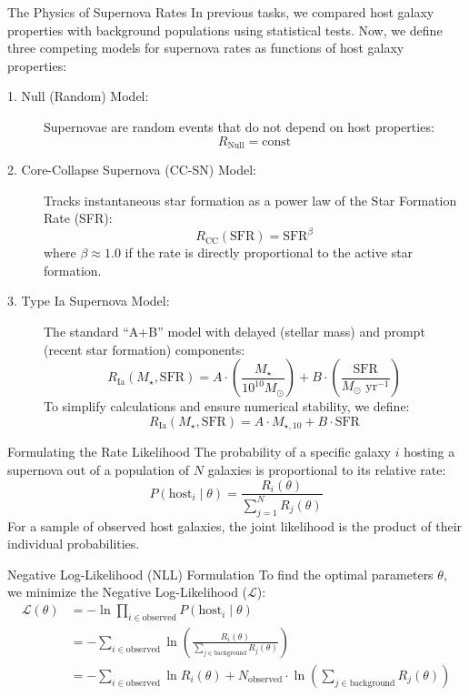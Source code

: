 \documentclass[9pt]{beamer}
\begin{document}
\begin{frame}{The Physics of Supernova Rates}
  In previous tasks, we compared host galaxy properties with background populations using statistical tests. Now, we define three competing models for supernova rates as functions of host galaxy properties:
  \begin{description}
    \item[1. Null (Random) Model:] Supernovae are random events that do not depend on host properties:
      $$R_{\text{Null}} = \text{const}$$
    \item[2. Core-Collapse Supernova (CC-SN) Model:] Tracks instantaneous star formation as a power law of the Star Formation Rate (SFR):
      $$R_{\text{CC}}(\text{SFR}) = \text{SFR}^\beta$$
      where $\beta \approx 1.0$ if the rate is directly proportional to the active star formation.
    \item[3. Type Ia Supernova Model:] The standard ``A+B'' model with delayed (stellar mass) and prompt (recent star formation) components:
      $$R_{\text{Ia}}(M_\star, \text{SFR}) = A \cdot \left(\frac{M_\star}{10^{10} M_\odot}\right) + B \cdot \left(\frac{\text{SFR}}{M_\odot \text{ yr}^{-1}}\right)$$
      To simplify calculations and ensure numerical stability, we define:
      $$R_{\text{Ia}}(M_\star, \text{SFR}) = A \cdot M_{\star, 10} + B \cdot \text{SFR}$$
  \end{description}
\end{frame}

\begin{frame}{Formulating the Rate Likelihood}
  The probability of a specific galaxy $i$ hosting a supernova out of a population of $N$ galaxies is proportional to its relative rate:
  $$P(\text{host}_i \mid \theta) = \frac{R_i(\theta)}{\sum_{j=1}^N R_j(\theta)}$$
  For a sample of observed host galaxies, the joint likelihood is the product of their individual probabilities.
  \begin{block}{Negative Log-Likelihood (NLL) Formulation}
    To find the optimal parameters $\theta$, we minimize the Negative Log-Likelihood ($\mathcal{L}$):
    \begin{align*}
      \mathcal{L}(\theta) &= - \ln \prod_{i \in \text{observed}} P(\text{host}_i \mid \theta) \\
      &= - \sum_{i \in \text{observed}} \ln \left( \frac{R_i(\theta)}{\sum_{j \in \text{background}} R_j(\theta)} \right) \\
      &= -\sum_{i \in \text{observed}} \ln R_i(\theta) + N_{\text{observed}} \cdot \ln \left(\sum_{j \in \text{background}} R_j(\theta)\right)
    \end{align*}
  \end{block}
\end{frame}
\end{document}
